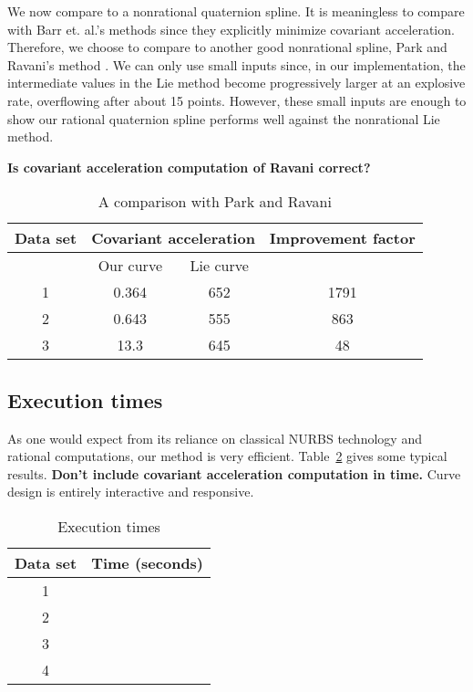 We now compare to a nonrational quaternion spline.
It is meaningless to compare with Barr et. al.'s methods \cite{barr92,rama97}
since they explicitly minimize covariant acceleration.
Therefore, we choose to compare to another good nonrational spline,
Park and Ravani's method \cite{park97}.
We can only use small inputs since, in our implementation,
the intermediate values in the Lie method 
become progressively larger at an explosive rate,
overflowing after about 15 points.
However, these small inputs are enough to show our rational quaternion spline
performs well against the nonrational Lie method.

{\bf Is covariant acceleration computation of Ravani correct?}

\begin{table}
\label{tab:cov3}
\begin{tabular}{|c|c|c|c|}  	\hline
Data set & \multicolumn{2}{c|}{Covariant acceleration} & Improvement factor \\ \hline
	 & Our curve & Lie curve & \\ \hline
1 & 0.364 & 652 & 1791 \\ \hline
2 & 0.643 & 555 & 863 \\ \hline
3 & 13.3  & 645 & 48 \\ \hline
\end{tabular}
\caption{A comparison with Park and Ravani}
\end{table}

\subsection{Execution times}

As one would expect from its reliance on classical NURBS technology
and rational computations, our method is very efficient.
Table~\ref{tab:time} gives some typical results.
{\bf Don't include covariant acceleration computation in time.}
Curve design is entirely interactive and responsive.

\begin{table}
\label{tab:time}
\begin{tabular}{|c|c|}  	\hline
Data set & Time (seconds) \\ \hline
1 &  \\ \hline
2 &  \\ \hline
3 &  \\ \hline
4 &  \\ \hline
\end{tabular}
\caption{Execution times}
\end{table}

